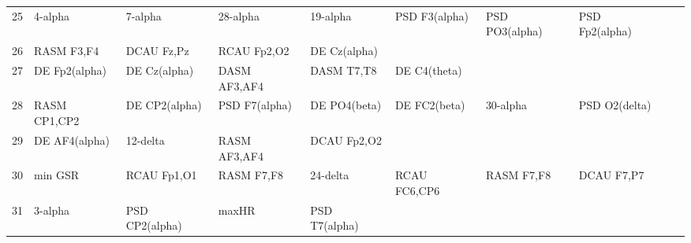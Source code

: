 \begin{landscape}
\begin{table}[]
\begin{tabular}{l|llllllll}
25       & 4-alpha               & 7-alpha               & 28-alpha             & 19-alpha                & PSD F3(alpha)           & PSD PO3(alpha)       & PSD Fp2(alpha)       &                       &                       &                    \\
26       & RASM F3,F4            & DCAU Fz,Pz            & RCAU Fp2,O2          & DE Cz(alpha)            &                         &                      &                      &                       &                       &                    \\
27       & DE Fp2(alpha)         & DE Cz(alpha)          & DASM AF3,AF4         & DASM T7,T8              & DE C4(theta)            &                      &                      &                       &                       &                    \\
28       & RASM CP1,CP2          & DE CP2(alpha)         & PSD F7(alpha)        & DE PO4(beta)            & DE FC2(beta)            & 30-alpha             & PSD O2(delta)        &                       &                       &                    \\
29       & DE AF4(alpha)         & 12-delta              & RASM AF3,AF4         & DCAU Fp2,O2             &                         &                      &                      &                       &                       &                    \\
30       & min GSR               & RCAU Fp1,O1           & RASM F7,F8           & 24-delta                & RCAU FC6,CP6            & RASM F7,F8           & DCAU F7,P7           &                       &                       &                    \\
31       & 3-alpha               & PSD CP2(alpha)        & maxHR                & PSD T7(alpha)           &                         &                      &                      &                       &                       &                    \\
\end{tabular}
\end{table}
\end{landscape}
\clearpage
